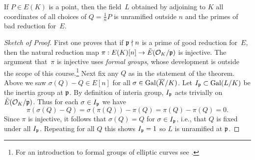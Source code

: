 \begin{theorem}\label{thm:mwunram}
	If $P\in E(K)$ is a point, then the field~$L$ obtained by adjoining to $K$
	all coordinates of all choices of $Q=\frac{1}{n}P$ is unramified
	outside $n$ and the primes of bad reduction for~$E$.
\end{theorem}
\begin{proof}[Sketch of Proof]
	First one proves that if $\mathfrak{p} \nmid n$ is a prime of good reduction
	for~$E$, then the natural reduction map $\pi: E(K)[n] \to
	\tilde{E}(\mathcal{O}_K/\mathfrak{p})$ is injective.  The argument that~$\pi$ is
	injective uses \emph{formal groups}, whose development is outside the
	scope of this course.\footnote{For an introduction to
	formal groups of elliptic curves see \cite[Ch. IV]{silverman:aec}.}
	Next fix any $Q$ as in the statement of the theorem.
	Above we saw $\sigma(Q)-Q \in E[n]$ for
	all $\sigma \in \operatorname{Gal}(\overline{K}/K)$.  Let $I_{\mathfrak{p}}\subset \operatorname{Gal}(L/K)$ be the
	inertia group at $\mathfrak{p}$. By definition of interia group, $I_{\mathfrak{p}}$
	acts trivially on $\tilde{E}(\mathcal{O}_K/\mathfrak{p})$.  Thus for each $\sigma \in
	I_{\mathfrak{p}}$ we have
	$$
		\pi(\sigma(Q) - Q) = \sigma(\pi(Q)) - \pi(Q) = \pi(Q) - \pi(Q) = 0.
	$$
	Since $\pi$ is injective, it follows that $\sigma(Q) = Q$ for $\sigma\in I_{\mathfrak{p}}$,
	i.e., that $Q$ is fixed under all $I_{\mathfrak{p}}$.
	Repeating for all $Q$ this shows $I_{\mathfrak{p}} = 1$ so $L$ is unramified
	at $\mathfrak{p}$.

\end{proof}


